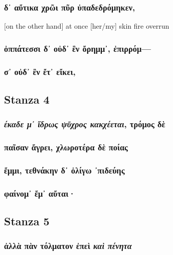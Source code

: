 \subsubsection*{δ᾽ αὔτικα χρῶι πῦρ ὐπαδεδρόμηκεν,}
[on the other hand] at once [her/my] skin fire overrun

\subsubsection*{ὀππάτεσσι δ᾽ οὐδ᾽ ἒν ὄρημμ᾽, ἐπιρρόμ---}


\subsubsection*{σ᾽ οὐδ᾽ ἒν ἔτ᾽ εἴκει,}

\subsection*{Stanza 4}
\subsubsection*{\emph{έκαδε μ᾽ ἴδρως ψῦχρος κακχέεται}, τρόμος δὲ}

\subsubsection*{παῖσαν ἄγρει, χλωροτέρα δὲ ποίας}

\subsubsection*{ἔμμι, τεθνάκην δ᾽ ὀλίγω ᾽πιδεύης}

\subsubsection*{φαίνομ᾽ ἔμ᾽ αὔται·}

\subsection*{Stanza 5}
\subsubsection*{ἀλλὰ πὰν τόλματον ἐπεὶ \emph{καὶ πένητα}}
